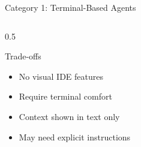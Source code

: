 \documentclass[aspectratio=169,11pt]{beamer}
\begin{document}
\begin{frame}{Category 1: Terminal-Based Agents}
\begin{columns}[T]
\begin{column}{0.5\textwidth}
            \begin{alertblock}{Trade-offs}
                \begin{itemize}
                    \item No visual IDE features
                    \item Require terminal comfort
                    \item Context shown in text only
                    \item May need explicit instructions
                \end{itemize}
            \end{alertblock}
        \end{column}
    \end{columns}

\end{frame}
\end{document}
